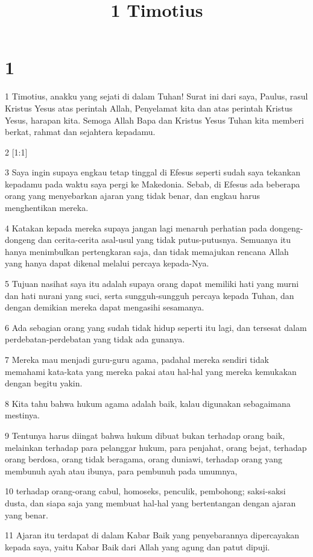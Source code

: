 

\title{1 Timotius}


\chapter{1}

\par 1 Timotius, anakku yang sejati di dalam Tuhan! Surat ini dari saya, Paulus, rasul Kristus Yesus atas perintah Allah, Penyelamat kita dan atas perintah Kristus Yesus, harapan kita. Semoga Allah Bapa dan Kristus Yesus Tuhan kita memberi berkat, rahmat dan sejahtera kepadamu.
\par 2 [1:1]
\par 3 Saya ingin supaya engkau tetap tinggal di Efesus seperti sudah saya tekankan kepadamu pada waktu saya pergi ke Makedonia. Sebab, di Efesus ada beberapa orang yang menyebarkan ajaran yang tidak benar, dan engkau harus menghentikan mereka.
\par 4 Katakan kepada mereka supaya jangan lagi menaruh perhatian pada dongeng-dongeng dan cerita-cerita asal-usul yang tidak putus-putusnya. Semuanya itu hanya menimbulkan pertengkaran saja, dan tidak memajukan rencana Allah yang hanya dapat dikenal melalui percaya kepada-Nya.
\par 5 Tujuan nasihat saya itu adalah supaya orang dapat memiliki hati yang murni dan hati nurani yang suci, serta sungguh-sungguh percaya kepada Tuhan, dan dengan demikian mereka dapat mengasihi sesamanya.
\par 6 Ada sebagian orang yang sudah tidak hidup seperti itu lagi, dan tersesat dalam perdebatan-perdebatan yang tidak ada gunanya.
\par 7 Mereka mau menjadi guru-guru agama, padahal mereka sendiri tidak memahami kata-kata yang mereka pakai atau hal-hal yang mereka kemukakan dengan begitu yakin.
\par 8 Kita tahu bahwa hukum agama adalah baik, kalau digunakan sebagaimana mestinya.
\par 9 Tentunya harus diingat bahwa hukum dibuat bukan terhadap orang baik, melainkan terhadap para pelanggar hukum, para penjahat, orang bejat, terhadap orang berdosa, orang tidak beragama, orang duniawi, terhadap orang yang membunuh ayah atau ibunya, para pembunuh pada umumnya,
\par 10 terhadap orang-orang cabul, homoseks, penculik, pembohong; saksi-saksi dusta, dan siapa saja yang membuat hal-hal yang bertentangan dengan ajaran yang benar.
\par 11 Ajaran itu terdapat di dalam Kabar Baik yang penyebarannya dipercayakan kepada saya, yaitu Kabar Baik dari Allah yang agung dan patut dipuji.
